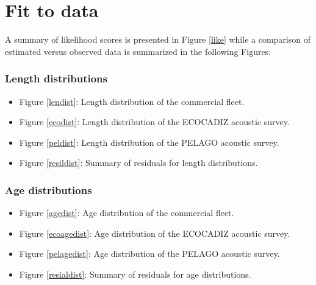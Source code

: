 \documentclass[review]{elsarticle}
\begin{document}
\section{Fit to data}

A summary of likelihood scores is presented in Figure \ref{like} while a comparison of estimated versus observed data is summarized in the following Figures:

\subsubsection*{Length distributions}
\begin{itemize}
\item Figure \ref{lendist}: Length distribution of the commercial fleet.
\item Figure \ref{ecodist}: Length distribution of the ECOCADIZ acoustic survey. 
\item Figure \ref{peldist}: Length distribution of the PELAGO acoustic survey.
\item Figure \ref{resildist}: Summary of residuals for length distributions.
\end{itemize}
\subsubsection*{Age distributions}
\begin{itemize}
\item Figure \ref{agedist}: Age distribution of the commercial fleet.
\item Figure \ref{ecoagedist}: Age distribution of the ECOCADIZ acoustic survey. 
\item Figure \ref{pelagedist}: Age distribution of the PELAGO acoustic survey.
\item Figure \ref{resialdist}: Summary of residuals for age distributions.
\end{itemize}


\end{document}
